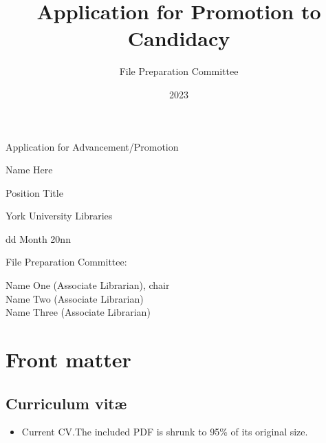 \documentclass[12pt,oneside]{book}
\title{Application for Promotion to Candidacy}
\author{File Preparation Committee}
\date{2023}
\begin{document}
\frontmatter

\begin{titlepage}

  \null\vfill

  \begin{center}

    {\Huge
      Application for Advancement/Promotion
    }
    \vspace{2cm}

    {\Large
      Name Here
    }
    \vspace{1cm}

  {\large
    Position Title

    York University Libraries

    \vspace{1cm}

    dd Month 20nn

  }

\end{center}

\vfill
\vfill

{\large
  File Preparation Committee:

  Name One (Associate Librarian), chair \\
  \indent Name Two (Associate Librarian) \\
  \indent Name Three (Associate Librarian)
}

\hfill

\end{titlepage}



\tableofcontents

\markboth{}{}

\mainmatter{}

\chapter{Front matter}


\section{Curriculum vit\ae}

\begin{itemize}
  \item Current CV.\@  The included PDF is shrunk to 95\% of its original size.
\end{itemize}
\end{document}
